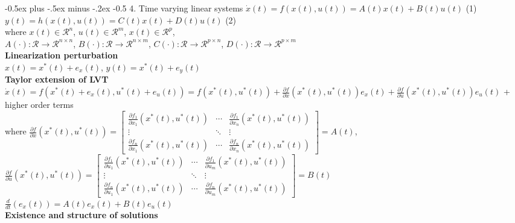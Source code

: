 \documentclass[10pt,landscape]{article}
\makeatletter
\renewcommand{\section}{\@startsection{section}{1}{0mm}%
                                {-0.5ex plus -.5ex minus -.2ex}%
                                {-0.5\baselineskip}%
                                {\normalfont\small\bfseries}}
\makeatother
\begin{document}
\begin{multicols*}{4}
\section{4. Time varying linear systems}
$\dot{x}(t) = f(x(t), u(t)) = A(t)x(t) + B(t)u(t)$ \qquad (1)\\
$y(t) = h(x(t), u(t)) = C(t)x(t) + D(t)u(t)$ \qquad (2)\\
where $x(t) \in \mathcal{R}^n$, $u(t) \in \mathcal{R}^m$, $x(t) \in \mathcal{R}^p$, \\
$A(\cdot):  \mathcal{R} \rightarrow \mathcal{R}^{n \times n}$, $B(\cdot):  \mathcal{R} \rightarrow \mathcal{R}^{n \times m}$, $C(\cdot):  \mathcal{R} \rightarrow \mathcal{R}^{p \times n}$, $D(\cdot):  \mathcal{R} \rightarrow \mathcal{R}^{p \times m}$ \\
\textbf{Linearization perturbation}\\
$x(t) = x^*(t) + e_x(t)$, $y(t) = x^*(t) + e_y(t)$\\
\textbf{Taylor extension of LVT}
$\dot{x}(t) = f(x^*(t)+e_x(t), u^*(t)+e_u(t))=f(x^*(t), u^*(t))+\frac{\partial{f}}{\partial{x}}(x^*(t), u^*(t))e_x(t)+\frac{\partial f}{\partial u}(x^*(t), u^*(t))e_u(t)$  + higher order terms\\
where 
$
\frac{\partial{f}}{\partial{x}}(x^*(t), u^*(t)) = \left[ \begin{array}{ccc} \frac{\partial{f_1}}{\partial{x_1}}(x^*(t), u^*(t)) & \cdots & \frac{\partial{f_1}}{\partial{x_n}}(x^*(t), u^*(t))\\
	\vdots & \ddots & \vdots \\
	\frac{\partial{f_n}}{\partial{x_1}}(x^*(t), u^*(t)) & \cdots & \frac{\partial{f_n}}{\partial{x_n}}(x^*(t), u^*(t))
\end{array} \right] = A(t)
$,\\
$
\frac{\partial{f}}{\partial{u}}(x^*(t), u^*(t)) = \left[ \begin{array}{ccc} \frac{\partial{f_1}}{\partial{u_1}}(x^*(t), u^*(t)) & \cdots & \frac{\partial{f_1}}{\partial{u_m}}(x^*(t), u^*(t))\\
	\vdots & \ddots & \vdots \\
	\frac{\partial{f_n}}{\partial{u_1}}(x^*(t), u^*(t)) & \cdots & \frac{\partial{f_n}}{\partial{u_m}}(x^*(t), u^*(t))
\end{array} \right] = B(t)
$\\
$\frac{d}{dt}(e_x(t))=A(t)e_x(t)+B(t)e_u(t)$\\
\textbf{Existence and structure of solutions}
\begin{tabular}{|c|c|c|c|}

\end{tabular}
\end{multicols*}
\end{document}
